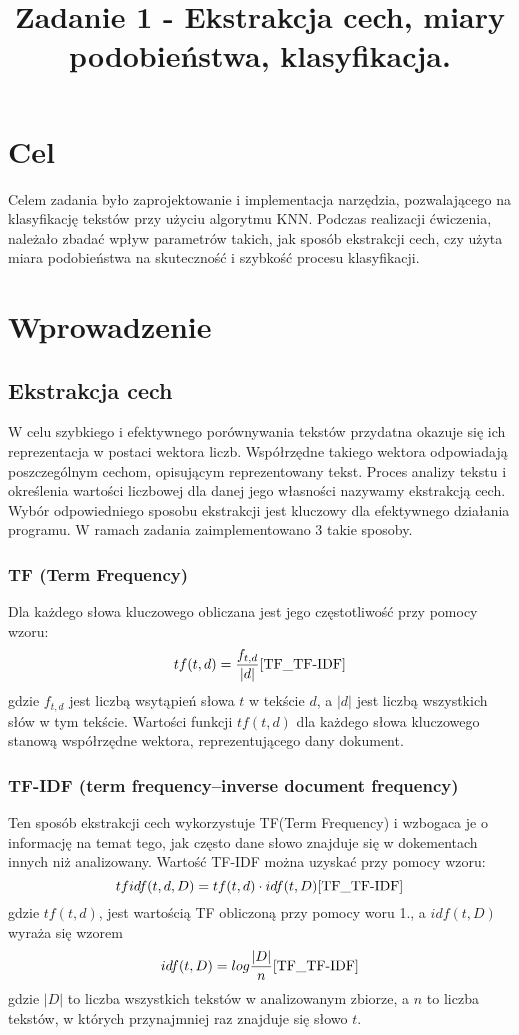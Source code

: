\documentclass{classrep}
\author{
  \studentinfo{Paweł Młynarczyk}{210278} \and
  \studentinfo{Mateusz Kuźniarek}{210245}
}
\title{Zadanie 1 - Ekstrakcja cech, miary podobieństwa, klasyfikacja.}
\begin{document}
\maketitle

\section{Cel}
Celem zadania było zaprojektowanie i implementacja narzędzia, pozwalającego na klasyfikację tekstów przy użyciu algorytmu KNN. Podczas realizacji ćwiczenia, należało zbadać wpływ parametrów takich, jak sposób ekstrakcji cech, czy użyta miara podobieństwa na skuteczność i szybkość procesu klasyfikacji.

\section{Wprowadzenie}
\subsection{Ekstrakcja cech}
W celu szybkiego i efektywnego porównywania tekstów przydatna okazuje się ich reprezentacja w postaci wektora liczb. Współrzędne takiego wektora odpowiadają poszczególnym cechom, opisującym reprezentowany tekst. Proces analizy tekstu i określenia wartości liczbowej dla danej jego własności nazywamy ekstrakcją cech. Wybór odpowiedniego sposobu ekstrakcji jest kluczowy dla efektywnego działania programu. W ramach zadania zaimplementowano 3 takie sposoby.

\subsubsection{TF (Term Frequency)}
Dla każdego słowa kluczowego obliczana jest jego częstotliwość przy pomocy wzoru: 
\begin{equation}
tf(t,d) =  \frac{f_{t,d}}{|d|} \cite{TF_TF-IDF}
\end{equation}
gdzie \(f_{t,d}\) jest liczbą wsytąpień słowa \(t\) w tekście \(d\), a \(|d|\) jest liczbą wszystkich słów w tym tekście. Wartości funkcji \(tf(t,d)\) dla każdego słowa kluczowego stanową współrzędne wektora, reprezentującego dany dokument.

\subsubsection{TF-IDF (term frequency–inverse document frequency)}
Ten sposób ekstrakcji cech wykorzystuje TF(Term Frequency) i wzbogaca je o informację na temat tego, jak często dane słowo znajduje się w dokementach innych niż analizowany. Wartość TF-IDF można uzyskać przy pomocy wzoru: 
\begin{equation}
tfidf(t,d,D) = tf(t,d) \cdot idf(t,D) \cite{TF_TF-IDF}
\end{equation}
gdzie \(tf(t,d)\), jest wartością TF obliczoną przy pomocy woru 1., a \(idf(t,D)\) wyraża się wzorem
\begin{equation}
idf(t,D) = log\frac{|D|}{n} \cite{TF_TF-IDF}
\end{equation}
gdzie \(|D|\) to liczba wszystkich tekstów w analizowanym zbiorze, a \(n\) to liczba tekstów, w których przynajmniej raz znajduje się słowo \(t\).
\end{document}

